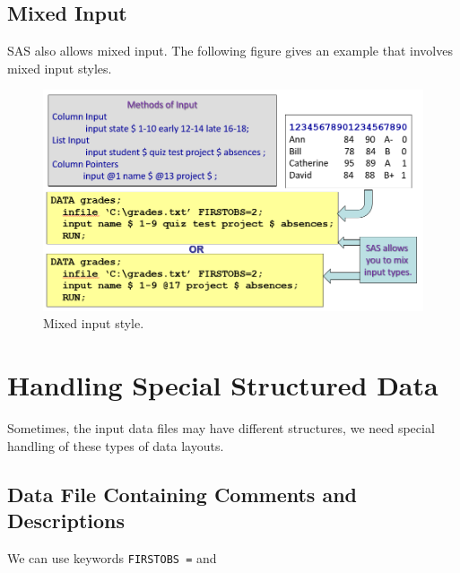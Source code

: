 \documentclass[
]{book}
\begin{document}
\hypertarget{mixed-input}{%
\subsection{Mixed Input}\label{mixed-input}}

SAS also allows mixed input. The following figure gives an example that involves mixed input styles.

\begin{figure}

{\centering \includegraphics[width=0.85\linewidth]{img03/w03-MixedInput} 

}

\caption{Mixed input style.}\label{fig:unnamed-chunk-19}
\end{figure}

\hypertarget{handling-special-structured-data}{%
\section{Handling Special Structured Data}\label{handling-special-structured-data}}

Sometimes, the input data files may have different structures, we need special handling of these types of data layouts.

\hypertarget{data-file-containing-comments-and-descriptions}{%
\subsection{Data File Containing Comments and Descriptions}\label{data-file-containing-comments-and-descriptions}}

We can use keywords \texttt{FIRSTOBS\ =} and
\end{document}
